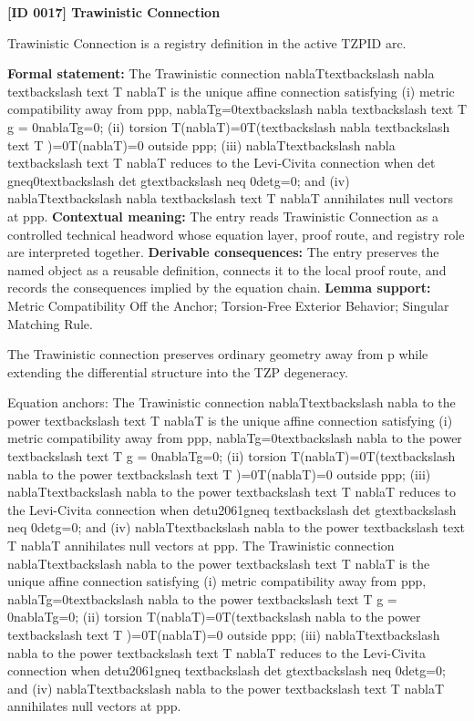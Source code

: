 \clearpage
\noindent\textbf{[ID 0017] Trawinistic Connection}\par
\vspace{0.35em}
\begingroup\small
{}
Trawinistic Connection is a registry definition in the active TZPID arc.

\begingroup\footnotesize\setlength{\emergencystretch}{3em}\sloppy
\textbf{Formal statement:} The Trawinistic connection nablaTtextbackslash nabla textbackslash text T nablaT is the unique affine connection satisfying (i) metric compatibility away from ppp, nablaTg=0textbackslash nabla textbackslash text T g = 0nablaTg=0; (ii) torsion T(nablaT)=0T(textbackslash nabla textbackslash text T )=0T(nablaT)=0 outside ppp; (iii) nablaTtextbackslash nabla textbackslash text T nablaT reduces to the Levi-Civita connection when det gneq0textbackslash det gtextbackslash neq 0detg=0; and (iv) nablaTtextbackslash nabla textbackslash text T nablaT annihilates null vectors at ppp. \textbf{Contextual meaning:} The entry reads Trawinistic Connection as a controlled technical headword whose equation layer, proof route, and registry role are interpreted together. \textbf{Derivable consequences:} The entry preserves the named object as a reusable definition, connects it to the local proof route, and records the consequences implied by the equation chain. \textbf{Lemma support:} Metric Compatibility Off the Anchor; Torsion-Free Exterior Behavior; Singular Matching Rule.\par
\endgroup

The Trawinistic connection preserves ordinary geometry away from p while extending the differential structure into the TZP degeneracy.

Equation anchors: The Trawinistic connection nablaTtextbackslash nabla to the power textbackslash text T nablaT is the unique affine connection satisfying (i) metric compatibility away from ppp, nablaTg=0textbackslash nabla to the power textbackslash text T g = 0nablaTg=0; (ii) torsion T(nablaT)=0T(textbackslash nabla to the power textbackslash text T )=0T(nablaT)=0 outside ppp; (iii) nablaTtextbackslash nabla to the power textbackslash text T nablaT reduces to the Levi-Civita connection when detu2061gneq textbackslash det gtextbackslash neq 0detg=0; and (iv) nablaTtextbackslash nabla to the power textbackslash text T nablaT annihilates null vectors at ppp. The Trawinistic connection nablaTtextbackslash nabla to the power textbackslash text T nablaT is the unique affine connection satisfying (i) metric compatibility away from ppp, nablaTg=0textbackslash nabla to the power textbackslash text T g = 0nablaTg=0; (ii) torsion T(nablaT)=0T(textbackslash nabla to the power textbackslash text T )=0T(nablaT)=0 outside ppp; (iii) nablaTtextbackslash nabla to the power textbackslash text T nablaT reduces to the Levi-Civita connection when detu2061gneq textbackslash det gtextbackslash neq 0detg=0; and (iv) nablaTtextbackslash nabla to the power textbackslash text T nablaT annihilates null vectors at ppp.

